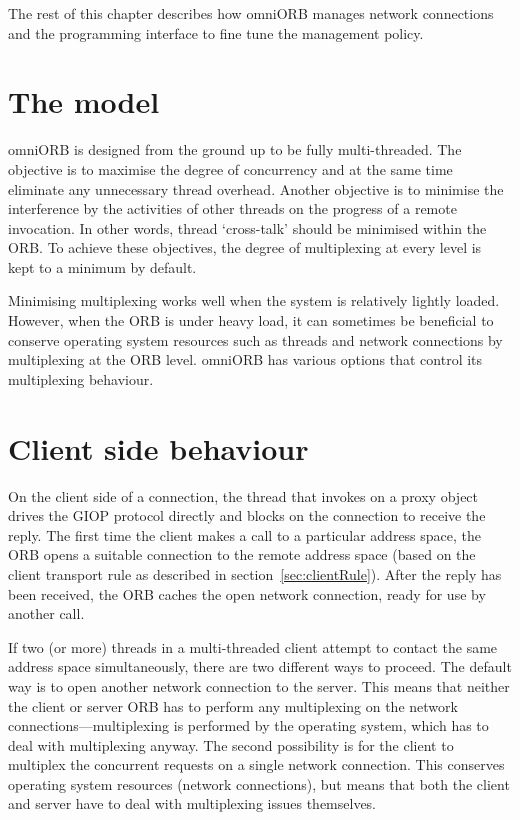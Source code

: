 \documentclass[11pt,oneside,a4paper]{book}
\begin{document}
The rest of this chapter describes how omniORB manages network
connections and the programming interface to fine tune the management
policy.


\section{The model}

omniORB is designed from the ground up to be fully multi-threaded. The
objective is to maximise the degree of concurrency and at the same
time eliminate any unnecessary thread overhead. Another objective is
to minimise the interference by the activities of other threads on the
progress of a remote invocation. In other words, thread `cross-talk'
should be minimised within the ORB. To achieve these objectives, the
degree of multiplexing at every level is kept to a minimum by default.

Minimising multiplexing works well when the system is relatively
lightly loaded. However, when the ORB is under heavy load, it can
sometimes be beneficial to conserve operating system resources such as
threads and network connections by multiplexing at the ORB
level. omniORB has various options that control its multiplexing
behaviour.


\section{Client side behaviour}

On the client side of a connection, the thread that invokes on a proxy
object drives the GIOP protocol directly and blocks on the connection
to receive the reply. The first time the client makes a call to a
particular address space, the ORB opens a suitable connection to the
remote address space (based on the client transport rule as described
in section~\ref{sec:clientRule}). After the reply has been received,
the ORB caches the open network connection, ready for use by another
call.

If two (or more) threads in a multi-threaded client attempt to contact
the same address space simultaneously, there are two different ways to
proceed. The default way is to open another network connection to the
server. This means that neither the client or server ORB has to
perform any multiplexing on the network connections---multiplexing is
performed by the operating system, which has to deal with multiplexing
anyway. The second possibility is for the client to multiplex the
concurrent requests on a single network connection. This conserves
operating system resources (network connections), but means that both
the client and server have to deal with multiplexing issues
themselves.
\end{document}
